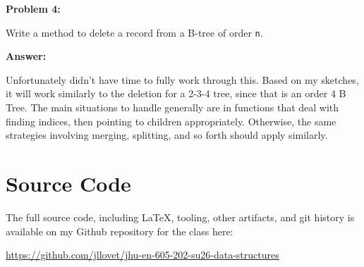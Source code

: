 \documentclass[10pt,letterpaper,final]{report}
\begin{document}
\pagebreak
\noindent\textbf{Problem 4:}
\medskip

Write a method to delete a record from a B-tree of order \texttt{n}.

\medskip



\medskip
\noindent\textbf{Answer:}
\medskip

Unfortunately didn't have time to fully work through this. Based on my sketches, it will work similarly to the deletion for a 2-3-4 tree, since that is an order 4 B Tree. The main situations to handle generally are in functions that deal with finding indices, then pointing to children appropriately. Otherwise, the same strategies involving merging, splitting, and so forth should apply similarly.


\pagebreak

\section*{Source Code}
The full source code, including LaTeX, tooling, other artifacts, and git history is available on my Github repository for the class here:
\begin{center}
  \url{https://github.com/jllovet/jhu-en-605-202-su26-data-structures}
\end{center}

\printbibliography
\end{document}
